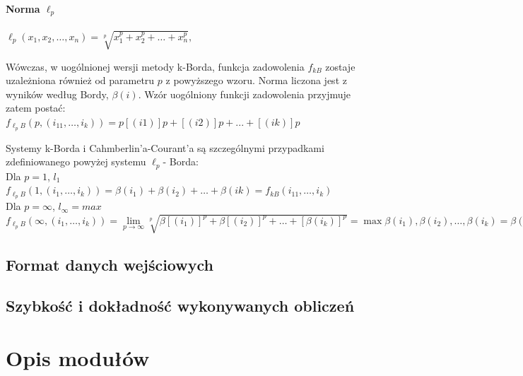 \documentclass{../aghdoc}               %
\begin{document}
\subsubsection{Norma $\ell_p$}
\label{subsubsection:norma_ell_p}

$\ell_p(x_1,x_2,\dots, x_n) = \sqrt[p]{x_1^p+x_2^p+\dots+x_n^p},$ 


Wówczas, w uogólnionej wersji metody k-Borda, funkcja zadowolenia $f_{kB}$ zostaje uzależniona również od parametru $p$ z powyższego wzoru. Norma liczona jest z wyników według Bordy, $\beta(i)$. Wzór uogólniony funkcji zadowolenia przyjmuje zatem postać:\\
$f_{\ell_pB}(p,(i_11,\dots,i_k))=p[(i1)]p+[(i2)]p+...+[(ik)]p$


Systemy  k-Borda i Cahmberlin’a-Courant’a są szczególnymi przypadkami zdefiniowanego powyżej systemu $\ell_p$- Borda:\\
Dla $p = 1$, $l_1$\\
$f_{\ell_pB}(1,(i_1, \dots ,i_k)) = \beta(i_1) + \beta(i_2) + \dots + \beta(ik) = f_{kB}(i_11, \dots,i_k)$\\
Dla $p= \infty$,  $l_{\infty}={max}$\\
$f_{\ell_pB}(\infty,(i_1, \dots ,i_k))=\lim\limits_{p \to \infty} \sqrt[p]{\beta\left[(i_1)\right]^p+\beta\left[(i_2)\right]^p+ \dots +\left[\beta(i_k)\right]^p}=\max{\beta(i_1),\beta(i_2),\dots,\beta(i_k)} = \beta(i_1)=f_{CC}$

\section{Format danych wejściowych}
\label{sec:format_danych_wejsciowych}

\section{Szybkość i dokładność wykonywanych obliczeń}
\label{sec:szybkosc_i_dokladnosc_wykonywanych_obliczen}

\chapter{Opis modułów}
\label{cha:opis_modulow}




\end{document}
